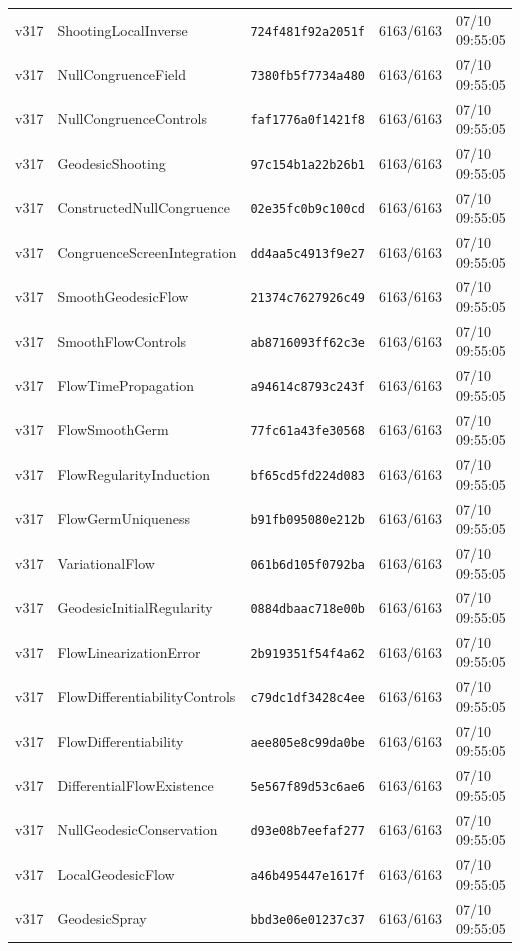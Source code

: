 \documentclass[11pt]{article}
\theoremstyle{definition}\newtheorem{deriv}{Derivação}
\begin{document}
{\begin{longtable}{@{}lllll@{}}
v317 & ShootingLocalInverse & \texttt{724f481f92a2051f} & 6163/6163 & 07/10 09:55:05 \\
v317 & NullCongruenceField & \texttt{7380fb5f7734a480} & 6163/6163 & 07/10 09:55:05 \\
v317 & NullCongruenceControls & \texttt{faf1776a0f1421f8} & 6163/6163 & 07/10 09:55:05 \\
v317 & GeodesicShooting & \texttt{97c154b1a22b26b1} & 6163/6163 & 07/10 09:55:05 \\
v317 & ConstructedNullCongruence & \texttt{02e35fc0b9c100cd} & 6163/6163 & 07/10 09:55:05 \\
v317 & CongruenceScreenIntegration & \texttt{dd4aa5c4913f9e27} & 6163/6163 & 07/10 09:55:05 \\
v317 & SmoothGeodesicFlow & \texttt{21374c7627926c49} & 6163/6163 & 07/10 09:55:05 \\
v317 & SmoothFlowControls & \texttt{ab8716093ff62c3e} & 6163/6163 & 07/10 09:55:05 \\
v317 & FlowTimePropagation & \texttt{a94614c8793c243f} & 6163/6163 & 07/10 09:55:05 \\
v317 & FlowSmoothGerm & \texttt{77fc61a43fe30568} & 6163/6163 & 07/10 09:55:05 \\
v317 & FlowRegularityInduction & \texttt{bf65cd5fd224d083} & 6163/6163 & 07/10 09:55:05 \\
v317 & FlowGermUniqueness & \texttt{b91fb095080e212b} & 6163/6163 & 07/10 09:55:05 \\
v317 & VariationalFlow & \texttt{061b6d105f0792ba} & 6163/6163 & 07/10 09:55:05 \\
v317 & GeodesicInitialRegularity & \texttt{0884dbaac718e00b} & 6163/6163 & 07/10 09:55:05 \\
v317 & FlowLinearizationError & \texttt{2b919351f54f4a62} & 6163/6163 & 07/10 09:55:05 \\
v317 & FlowDifferentiabilityControls & \texttt{c79dc1df3428c4ee} & 6163/6163 & 07/10 09:55:05 \\
v317 & FlowDifferentiability & \texttt{aee805e8c99da0be} & 6163/6163 & 07/10 09:55:05 \\
v317 & DifferentialFlowExistence & \texttt{5e567f89d53c6ae6} & 6163/6163 & 07/10 09:55:05 \\
v317 & NullGeodesicConservation & \texttt{d93e08b7eefaf277} & 6163/6163 & 07/10 09:55:05 \\
v317 & LocalGeodesicFlow & \texttt{a46b495447e1617f} & 6163/6163 & 07/10 09:55:05 \\
v317 & GeodesicSpray & \texttt{bbd3e06e01237c37} & 6163/6163 & 07/10 09:55:05 \\

\end{longtable}}
\end{document}
